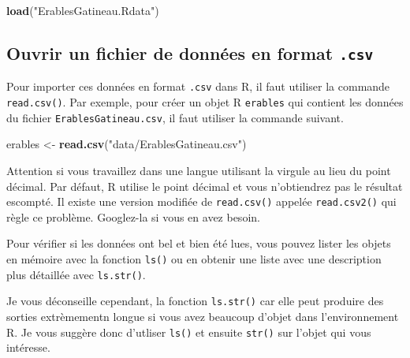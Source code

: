 \documentclass[12pt,]{book}
\makeatletter
\newenvironment{Shaded}{\begin{snugshade}}{\end{snugshade}}
\newcommand{\KeywordTok}[1]{\textcolor[rgb]{0.27,0.27,0.27}{\textbf{#1}}}
\newcommand{\NormalTok}[1]{#1}
\newcommand{\StringTok}[1]{\textcolor[rgb]{0.5,0.5,0.5}{#1}}
\newenvironment{kframe}{%
\medskip{}
\setlength{\fboxsep}{.8em}
 \def\at@end@of@kframe{}%
 \ifinner\ifhmode%
  \def\at@end@of@kframe{\end{minipage}}%
  \begin{minipage}{\columnwidth}%
 \fi\fi%
 \def\FrameCommand##1{\hskip\@totalleftmargin \hskip-\fboxsep
 \colorbox{shadecolor}{##1}\hskip-\fboxsep
     \hskip-\linewidth \hskip-\@totalleftmargin \hskip\columnwidth}%
 \MakeFramed {\advance\hsize-\width
   \@totalleftmargin\z@ \linewidth\hsize
   \@setminipage}}%
 {\par\unskip\endMakeFramed%
 \at@end@of@kframe}
\newenvironment{rmdblock}[1]
  {
  \begin{itemize}
  \renewcommand{\labelitemi}{
    \raisebox{-.7\height}[0pt][0pt]{
      {\setkeys{Gin}{width=3em,keepaspectratio}\texttt{[image: images/\#1]}}
    }
  }
  \setlength{\fboxsep}{1em}
  \begin{kframe}
  \item
  }
  {
  \end{kframe}
  \end{itemize}
  }
\newenvironment{rmdtip}
  {\begin{rmdblock}{tip}}
  {\end{rmdblock}}
\newenvironment{rmdwarning}
  {\begin{rmdblock}{warning}}
  {\end{rmdblock}}
\makeatother
\begin{document}
\begin{Shaded}
\begin{Highlighting}[]
\KeywordTok{load}\NormalTok{(}\StringTok{"ErablesGatineau.Rdata"}\NormalTok{)}
\end{Highlighting}
\end{Shaded}

\hypertarget{ouvrir-un-fichier-de-donnuxe9es-en-format-.csv}{%
\subsection{\texorpdfstring{Ouvrir un fichier de données en format \texttt{.csv}}{Ouvrir un fichier de données en format .csv}}\label{ouvrir-un-fichier-de-donnuxe9es-en-format-.csv}}

Pour importer ces données en format \texttt{.csv} dans R, il faut utiliser la commande \texttt{read.csv()}.
Par exemple, pour créer un objet R \texttt{erables} qui contient les données du fichier \texttt{ErablesGatineau.csv}, il faut utiliser la commande suivant.

\begin{Shaded}
\begin{Highlighting}[]
\NormalTok{erables <-}\StringTok{ }\KeywordTok{read.csv}\NormalTok{(}\StringTok{"data/ErablesGatineau.csv"}\NormalTok{)}
\end{Highlighting}
\end{Shaded}

\begin{rmdwarning}
Attention si vous travaillez dans une langue utilisant la virgule au lieu du point décimal.
Par défaut, R utilise le point décimal et vous n'obtiendrez pas le résultat escompté.
Il existe une version modifiée de \texttt{read.csv()} appelée \texttt{read.csv2()} qui règle ce problème.
Googlez-la si vous en avez besoin.
\end{rmdwarning}

Pour vérifier si les données ont bel et bien été lues, vous pouvez lister les objets en mémoire avec la fonction \texttt{ls()} ou en obtenir une liste avec une description plus détaillée avec \texttt{ls.str()}.

\begin{rmdtip}
Je vous déconseille cependant, la fonction \texttt{ls.str()} car elle peut produire des sorties extrèmementn longue si vous avez beaucoup d'objet dans l'environnement R. Je vous suggère donc d'utliser \texttt{ls()} et ensuite \texttt{str()} sur l'objet qui vous intéresse.
\end{rmdtip}
\end{document}
